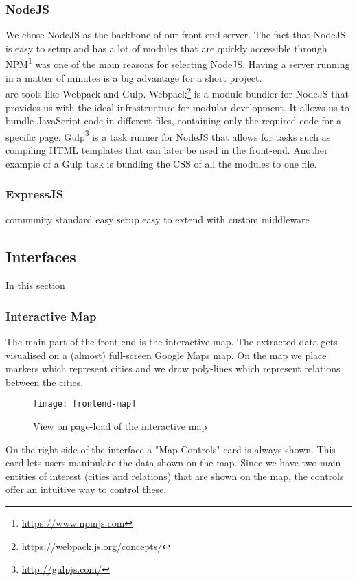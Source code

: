 \subsubsection{NodeJS}
We chose NodeJS as the backbone of our front-end server. The fact that NodeJS is easy to setup and has a lot of modules that are quickly accessible through NPM\footnote{\url{https://www.npmjs.com}} was one of the main reasons for selecting NodeJS. Having a server running in a matter of minutes is a big advantage for a short project.\\
 are tools like Webpack and Gulp. Webpack\footnote{\url{https://webpack.js.org/concepts/}} is a module bundler for NodeJS that provides us with the ideal infrastructure for modular development. It allows us to bundle JavaScript code in different files, containing only the required code for a specific page. Gulp\footnote{\url{http://gulpjs.com/}} is a task runner for NodeJS that allows for tasks such as compiling HTML templates that can later be used in the front-end. Another example of a Gulp task is bundling the CSS of all the modules to one file.
\subsubsection{ExpressJS}

community standard
easy setup
easy to extend with custom middleware

\subsection{Interfaces}
In this section 
\subsubsection{Interactive Map}
The main part of the front-end is the interactive map. The extracted data gets visualised on a (almost) full-screen Google Maps map. On the map we place markers which represent cities and we draw poly-lines which represent relations between the cities.

\begin{figure}[H]
\centering
\texttt{[image: frontend-map]}
\caption{View on page-load of the interactive map}
\label{fig:frontend-map}
\end{figure}

On the right side of the interface a "Map Controls" card is always shown. This card lets users manipulate the data shown on the map. Since we have two main entities of interest (cities and relations) that are shown on the map, the controls offer an intuitive way to control these.\\

